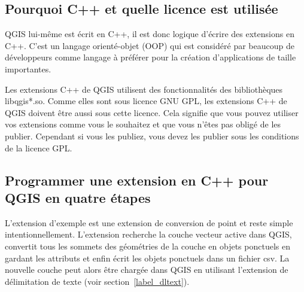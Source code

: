 \subsection{Pourquoi C++ et quelle licence est utilisée}

QGIS lui-même est écrit en C++, il est donc logique d'écrire des extensions en C++.
C'est un langage orienté-objet (OOP) qui est considéré par beaucoup de 
développeurs comme langage à préférer pour la création d'applications de taille 
importantes.

Les extensions C++ de QGIS utilisent des fonctionnalités des bibliothèques 
libqgis*.so. Comme elles sont sous licence GNU GPL, les extensions C++ de QGIS 
doivent être aussi sous cette licence. Cela signifie que vous pouvez utiliser 
vos extensions comme vous le souhaitez et que vous n'êtes pas obligé de les 
publier. Cependant si vous les publiez, vous devez les publier sous les 
conditions de la licence GPL.

\subsection{Programmer une extension en C++ pour QGIS en quatre étapes}

L'extension d'exemple est une extension de conversion de point et reste simple 
intentionnellement. L'extension recherche la couche vecteur active dans QGIS, 
convertit tous les sommets des géométries de la couche en objets ponctuels en 
gardant les attributs et enfin écrit les objets ponctuels dans un fichier csv. 
La nouvelle couche peut alors être chargée dans QGIS en utilisant l'extension de 
délimitation de texte (voir section~\ref{label_dltext}).

